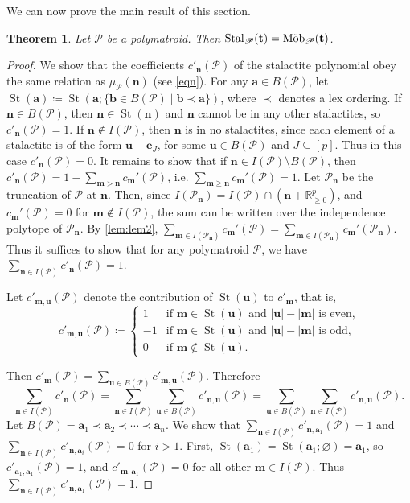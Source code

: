 \documentclass[a4paper, 11pt]{amsart}
\newtheorem{theorem}{Theorem}[section]
\theoremstyle{definition}
\newcommand{\bfu}{\mathbf{u}}
\newcommand{\bfm}{\mathbf{m}}
\newcommand{\bfn}{\mathbf{n}}
\newcommand{\bft}{\mathbf{t}}
\newcommand{\bfa}{\mathbf{a}}
\newcommand{\bfb}{\mathbf{b}}
\newcommand{\bfe}{\mathbf{e}}
\newcommand{\sP}{\mathscr{P}}
\newcommand{\R}{\mathbb{R}}
\DeclareMathOperator{\St}{St}
\DeclareMathOperator{\Stal}{Stal}
\DeclareMathOperator{\Mob}{\textnormal{M\"ob}}
\begin{document}
We can now prove the main result of this section. 
\begin{theorem}\label{thm:stal=mob}
    Let $\sP$ be a polymatroid. Then $\Stal_\sP(\bft) = \Mob_\sP(\bft)$. 
\end{theorem}
\begin{proof}
We show that the coefficients $c'_\bfn(\sP)$ of the stalactite polynomial obey the same relation as $\mu_\sP(\bfn)$ (see \autoref{eqn}). For any $\bfa \in B(\sP)$, let $\St(\bfa) \coloneqq \St(\bfa; \{\bfb \in B(\sP) \mid \bfb \prec \bfa\})$, where $\prec$ denotes a lex ordering. If $\bfn \in B(\sP)$, then $\bfn \in \St(\bfn)$ and $\bfn$ cannot be in any other stalactites, so $c'_\bfn(\sP) = 1$. If $\bfn \notin I(\sP)$, then $\bfn$ is in no stalactites, since each element of a stalactite is of the form $\bfu-\bfe_J$, for some $\bfu \in B(\sP)$ and $J \subseteq [p]$. Thus in this case $c'_\bfn(\sP) = 0$. It remains to show that if $\bfn \in I(\sP) \setminus B(\sP)$, then $c'_\bfn(\sP) = 1-\sum_{\bfm>\bfn}c_\bfm'(\sP)$, i.e. $\sum_{\bfm\ge\bfn}c_\bfm'(\sP) = 1$. Let $\sP_{\bfn}$ be the truncation of $\sP$ at $\bfn$. Then, since $I(\sP_\bfn) = I(\sP) \cap (\bfn + \R_{\ge 0}^p)$, and $c_{\bfm}'(\sP) = 0$ for $\bfm \notin I(\sP)$, the sum can be written over the independence polytope of $\sP_\bfn$. By \autoref{lem:lem2}, $\sum_{\bfm \in I(\sP_\bfn)}c_\bfm'(\sP) = \sum_{\bfm \in I(\sP_{\bfn})}c_\bfm'(\sP_{\bfn})$. Thus it suffices to show that for any polymatroid $\sP$, we have $\sum_{\bfn \in I(\sP)} c'_\bfn(\sP) = 1$. 

Let $c'_{\bfm, \bfu}(\sP)$ denote the contribution of $\St(\bfu)$ to $c'_\bfm$, that is, $$c'_{\bfm, \bfu}(\sP) \coloneqq \begin{cases}
    1 &\text{if } \bfm \in \St(\bfu) \text{ and } |\bfu| - |\bfm| \text{ is even,}\\
    -1 &\text{if } \bfm \in \St(\bfu) \text{ and } |\bfu| - |\bfm| \text{ is odd,}\\
    0 &\text{if } \bfm \notin \St(\bfu). 
\end{cases}$$

Then $c'_\bfm(\sP) = \sum_{\bfu \in B(\sP)} c'_{\bfm, \bfu}(\sP)$. Therefore 
\[\sum_{\bfn \in I(\sP)} c'_\bfn(\sP) = \sum_{\bfn \in I(\sP)}\sum_{\bfu \in B(\sP)} c'_{\bfn, \bfu}(\sP) = \sum_{\bfu \in B(\sP)}\sum_{\bfn \in I(\sP)} c'_{\bfn, \bfu}(\sP).\]
Let $B(\sP) = \bfa_1 \prec \bfa_2 \prec \cdots \prec \bfa_n$. We show that $\sum_{\bfn \in I(\sP)} c'_{\bfn, \bfa_1}(\sP) = 1$ and $\sum_{\bfn \in I(\sP)} c'_{\bfn, \bfa_i}(\sP) = 0$ for $i > 1$.
First, $\St(\bfa_1) = \St(\bfa_1; \varnothing) = \bfa_1$, so $c'_{\bfa_1,\bfa_1}(\sP) = 1$, and $c'_{\bfm, \bfa_1}(\sP) = 0$ for all other $\bfm \in I(\sP)$. Thus $\sum_{\bfn \in I(\sP)} c'_{\bfn, \bfa_1}(\sP) = 1$. 


\end{proof}
\end{document}
